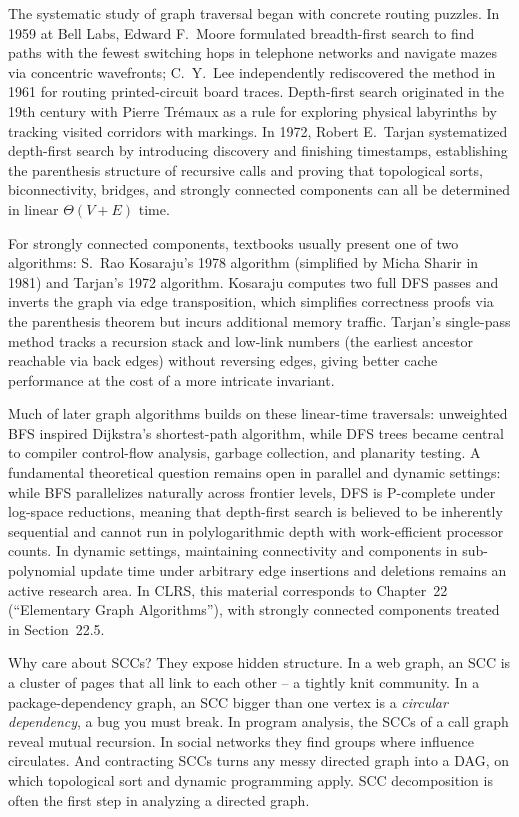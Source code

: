 \begin{historybox}
The systematic study of graph traversal began with concrete routing puzzles. In 1959 at Bell Labs, Edward F.\ Moore formulated breadth-first search to find paths with the fewest switching hops in telephone networks and navigate mazes via concentric wavefronts; C.\ Y.\ Lee independently rediscovered the method in 1961 for routing printed-circuit board traces. Depth-first search originated in the 19th century with Pierre Tr\'emaux as a rule for exploring physical labyrinths by tracking visited corridors with markings. In 1972, Robert E.\ Tarjan systematized depth-first search by introducing discovery and finishing timestamps, establishing the parenthesis structure of recursive calls and proving that topological sorts, biconnectivity, bridges, and strongly connected components can all be determined in linear $\Theta(V+E)$ time.

For strongly connected components, textbooks usually present one of two algorithms: S.\ Rao Kosaraju's 1978 algorithm (simplified by Micha Sharir in 1981) and Tarjan's 1972 algorithm. Kosaraju computes two full DFS passes and inverts the graph via edge transposition, which simplifies correctness proofs via the parenthesis theorem but incurs additional memory traffic. Tarjan's single-pass method tracks a recursion stack and low-link numbers (the earliest ancestor reachable via back edges) without reversing edges, giving better cache performance at the cost of a more intricate invariant.

Much of later graph algorithms builds on these linear-time traversals: unweighted BFS inspired Dijkstra's shortest-path algorithm, while DFS trees became central to compiler control-flow analysis, garbage collection, and planarity testing. A fundamental theoretical question remains open in parallel and dynamic settings: while BFS parallelizes naturally across frontier levels, DFS is P-complete under log-space reductions, meaning that depth-first search is believed to be inherently sequential and cannot run in polylogarithmic depth with work-efficient processor counts. In dynamic settings, maintaining connectivity and components in sub-polynomial update time under arbitrary edge insertions and deletions remains an active research area. In CLRS, this material corresponds to Chapter~22 (``Elementary Graph Algorithms''), with strongly connected components treated in Section~22.5.
\end{historybox}

\begin{aestheticbox}
Why care about SCCs? They expose hidden structure. In a web graph, an SCC is a
cluster of pages that all link to each other -- a tightly knit community. In a
package-dependency graph, an SCC bigger than one vertex is a \emph{circular
dependency}, a bug you must break. In program analysis, the SCCs of a call graph
reveal mutual recursion. In social networks they find groups where influence
circulates. And contracting SCCs turns any messy directed graph into a DAG, on
which topological sort and dynamic programming apply.
SCC decomposition is often the first step in analyzing a directed graph.
\end{aestheticbox}


